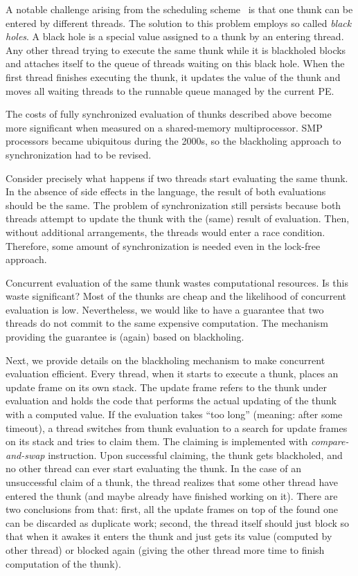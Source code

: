 \documentclass[11pt]{extarticle}
\begin{document}
A notable challenge arising from the scheduling scheme~\cite{Trinder96} is that one thunk can be entered by different threads. The solution to this problem employs so called \emph{black holes}. A black hole is a special value assigned to a thunk by an entering thread. Any other thread trying to execute the same thunk while it is blackholed blocks and attaches itself to the queue of threads waiting on this black hole. When the first thread finishes executing the thunk, it updates the value of the thunk and moves all waiting threads to the runnable queue managed by the current PE.

The costs of fully synchronized evaluation of thunks described above become more significant when measured on a shared-memory multiprocessor. SMP processors became ubiquitous during the 2000s, so the blackholing approach to synchronization had to be revised.

Consider precisely what happens if two threads start evaluating the same thunk. In the absence of side effects in the language, the result of both evaluations should be the same. The problem of synchronization still persists because both threads attempt to update the thunk with the (same) result of evaluation. Then, without additional arrangements, the threads would enter a race condition. Therefore, some amount of synchronization is needed even in the lock-free approach.

Concurrent evaluation of the same thunk wastes computational resources. Is this waste significant? Most of the thunks are cheap and the likelihood of concurrent evaluation is low. Nevertheless, we would like to have a guarantee that two threads do not commit to the same expensive computation. The mechanism providing the guarantee is (again) based on blackholing. 

Next, we provide details on the blackholing mechanism to make concurrent evaluation efficient.
Every thread, when it starts to execute a thunk, places an update frame on its own stack. The update frame refers to the thunk under evaluation and holds the code that performs the actual updating of the thunk with a computed value. If the evaluation takes ``too long'' (meaning: after some timeout), a thread switches from thunk evaluation to a search for update frames on its stack and tries to claim them. The claiming is implemented with \textit{compare-and-swap} instruction. Upon successful claiming, the thunk gets blackholed, and no other thread can ever start evaluating the thunk. In the case of an unsuccessful claim of a thunk, the thread realizes that some other thread have entered the thunk (and maybe already have finished working on it). There are two conclusions from that: first, all the update frames on top of the found one can be discarded as duplicate work; second, the thread itself should just block so that when it awakes it enters the thunk and just gets its value (computed by other thread) or blocked again (giving the other thread more time to finish computation of the thunk).
\end{document}
